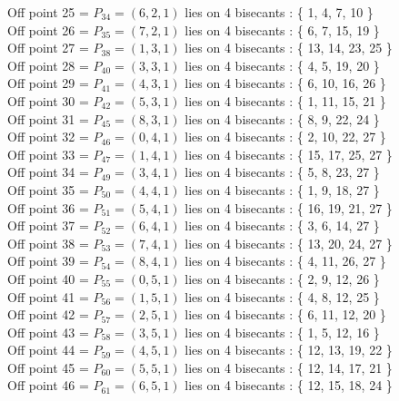 \documentclass{article}
\begin{document}
{Off point 25 = $P_{34} = ( 6, 2, 1 )$ lies on 4 bisecants : \{ 1, 4, 7, 10 \}\\
Off point 26 = $P_{35} = ( 7, 2, 1 )$ lies on 4 bisecants : \{ 6, 7, 15, 19 \}\\
Off point 27 = $P_{38} = ( 1, 3, 1 )$ lies on 4 bisecants : \{ 13, 14, 23, 25 \}\\
Off point 28 = $P_{40} = ( 3, 3, 1 )$ lies on 4 bisecants : \{ 4, 5, 19, 20 \}\\
Off point 29 = $P_{41} = ( 4, 3, 1 )$ lies on 4 bisecants : \{ 6, 10, 16, 26 \}\\
Off point 30 = $P_{42} = ( 5, 3, 1 )$ lies on 4 bisecants : \{ 1, 11, 15, 21 \}\\
Off point 31 = $P_{45} = ( 8, 3, 1 )$ lies on 4 bisecants : \{ 8, 9, 22, 24 \}\\
Off point 32 = $P_{46} = ( 0, 4, 1 )$ lies on 4 bisecants : \{ 2, 10, 22, 27 \}\\
Off point 33 = $P_{47} = ( 1, 4, 1 )$ lies on 4 bisecants : \{ 15, 17, 25, 27 \}\\
Off point 34 = $P_{49} = ( 3, 4, 1 )$ lies on 4 bisecants : \{ 5, 8, 23, 27 \}\\
Off point 35 = $P_{50} = ( 4, 4, 1 )$ lies on 4 bisecants : \{ 1, 9, 18, 27 \}\\
Off point 36 = $P_{51} = ( 5, 4, 1 )$ lies on 4 bisecants : \{ 16, 19, 21, 27 \}\\
Off point 37 = $P_{52} = ( 6, 4, 1 )$ lies on 4 bisecants : \{ 3, 6, 14, 27 \}\\
Off point 38 = $P_{53} = ( 7, 4, 1 )$ lies on 4 bisecants : \{ 13, 20, 24, 27 \}\\
Off point 39 = $P_{54} = ( 8, 4, 1 )$ lies on 4 bisecants : \{ 4, 11, 26, 27 \}\\
Off point 40 = $P_{55} = ( 0, 5, 1 )$ lies on 4 bisecants : \{ 2, 9, 12, 26 \}\\
Off point 41 = $P_{56} = ( 1, 5, 1 )$ lies on 4 bisecants : \{ 4, 8, 12, 25 \}\\
Off point 42 = $P_{57} = ( 2, 5, 1 )$ lies on 4 bisecants : \{ 6, 11, 12, 20 \}\\
Off point 43 = $P_{58} = ( 3, 5, 1 )$ lies on 4 bisecants : \{ 1, 5, 12, 16 \}\\
Off point 44 = $P_{59} = ( 4, 5, 1 )$ lies on 4 bisecants : \{ 12, 13, 19, 22 \}\\
Off point 45 = $P_{60} = ( 5, 5, 1 )$ lies on 4 bisecants : \{ 12, 14, 17, 21 \}\\
Off point 46 = $P_{61} = ( 6, 5, 1 )$ lies on 4 bisecants : \{ 12, 15, 18, 24 \}\\
}
\end{document}
